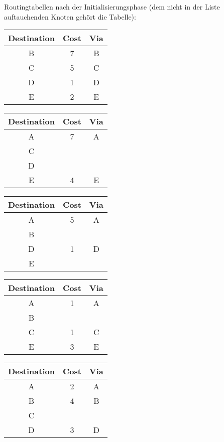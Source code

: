 \documentclass[a4paper,
			llpt,
			solution,
			accentcolor=tud2d,
			colorbacktitle
			]
			{tudexercise}
\newcommand{\8}{$\infty$}
\begin{document}
\begin{multicols}{3}
\begin{center}
\end{center}
\columnbreak
Routingtabellen nach der Initialisierungsphase (dem nicht in der Liste auftauchenden Knoten gehört die Tabelle): \\
\begin{tabular}{c|c|c}
Destination & Cost & Via \\ \hline
B           & 7    & B   \\
C           & 5    & C   \\
D           & 1    & D   \\
E           & 2    & E   \\
\end{tabular}
\begin{tabular}{c|c|c}
Destination & Cost & Via \\ \hline
A           & 7    & A   \\
C           &      &     \\
D           &      &     \\
E           & 4    & E   \\
\end{tabular}
\begin{tabular}{c|c|c}
Destination & Cost & Via \\ \hline
A           & 5    & A   \\
B           &      &     \\
D           & 1    & D   \\
E           &      &     \\
\end{tabular}
\begin{tabular}{c|c|c}
Destination & Cost & Via \\ \hline
A           & 1    & A   \\
B           &      &     \\
C           & 1    & C   \\
E           & 3    & E   \\
\end{tabular}
\begin{tabular}{c|c|c}
Destination & Cost & Via \\ \hline
A           & 2    & A   \\
B           & 4    & B   \\
C           &      &     \\
D           & 3    & D   \\
\end{tabular}
\end{multicols}
\end{document}
